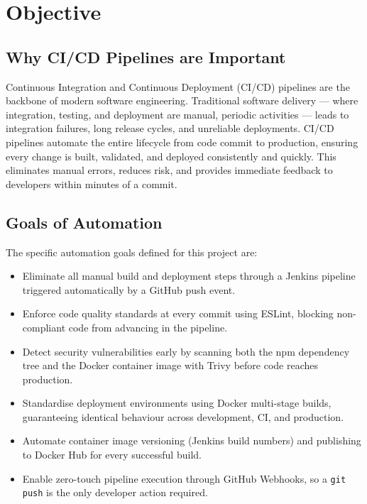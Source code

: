 \documentclass[12pt,a4paper,oneside]{report}
\begin{document}
\chapter{Objective}

\section{Why CI/CD Pipelines are Important}

Continuous Integration and Continuous Deployment (CI/CD) pipelines are the backbone
of modern software engineering. Traditional software delivery --- where integration,
testing, and deployment are manual, periodic activities --- leads to integration
failures, long release cycles, and unreliable deployments. CI/CD pipelines automate
the entire lifecycle from code commit to production, ensuring every change is built,
validated, and deployed consistently and quickly. This eliminates manual errors,
reduces risk, and provides immediate feedback to developers within minutes of a commit.

\section{Goals of Automation}

The specific automation goals defined for this project are:

\begin{itemize}
  \item Eliminate all manual build and deployment steps through a Jenkins pipeline
        triggered automatically by a GitHub push event.
  \item Enforce code quality standards at every commit using ESLint, blocking
        non-compliant code from advancing in the pipeline.
  \item Detect security vulnerabilities early by scanning both the npm dependency tree
        and the Docker container image with Trivy before code reaches production.
  \item Standardise deployment environments using Docker multi-stage builds,
        guaranteeing identical behaviour across development, CI, and production.
  \item Automate container image versioning (Jenkins build numbers) and publishing
        to Docker Hub for every successful build.
  \item Enable zero-touch pipeline execution through GitHub Webhooks, so a
        \texttt{git push} is the only developer action required.
\end{itemize}
\end{document}
